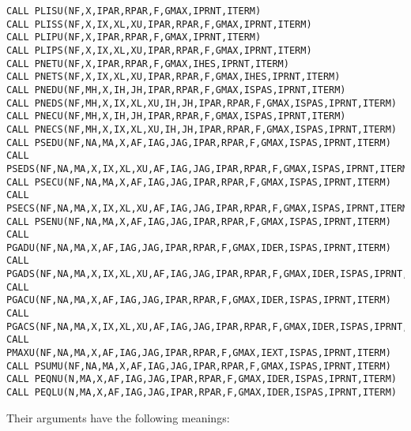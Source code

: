 \documentclass{esub2acm}
\begin{document}
\begin{verbatim}
CALL PLISU(NF,X,IPAR,RPAR,F,GMAX,IPRNT,ITERM)
CALL PLISS(NF,X,IX,XL,XU,IPAR,RPAR,F,GMAX,IPRNT,ITERM)
CALL PLIPU(NF,X,IPAR,RPAR,F,GMAX,IPRNT,ITERM)
CALL PLIPS(NF,X,IX,XL,XU,IPAR,RPAR,F,GMAX,IPRNT,ITERM)
CALL PNETU(NF,X,IPAR,RPAR,F,GMAX,IHES,IPRNT,ITERM)
CALL PNETS(NF,X,IX,XL,XU,IPAR,RPAR,F,GMAX,IHES,IPRNT,ITERM)
CALL PNEDU(NF,MH,X,IH,JH,IPAR,RPAR,F,GMAX,ISPAS,IPRNT,ITERM)
CALL PNEDS(NF,MH,X,IX,XL,XU,IH,JH,IPAR,RPAR,F,GMAX,ISPAS,IPRNT,ITERM)
CALL PNECU(NF,MH,X,IH,JH,IPAR,RPAR,F,GMAX,ISPAS,IPRNT,ITERM)
CALL PNECS(NF,MH,X,IX,XL,XU,IH,JH,IPAR,RPAR,F,GMAX,ISPAS,IPRNT,ITERM)
CALL PSEDU(NF,NA,MA,X,AF,IAG,JAG,IPAR,RPAR,F,GMAX,ISPAS,IPRNT,ITERM)
CALL PSEDS(NF,NA,MA,X,IX,XL,XU,AF,IAG,JAG,IPAR,RPAR,F,GMAX,ISPAS,IPRNT,ITERM)
CALL PSECU(NF,NA,MA,X,AF,IAG,JAG,IPAR,RPAR,F,GMAX,ISPAS,IPRNT,ITERM)
CALL PSECS(NF,NA,MA,X,IX,XL,XU,AF,IAG,JAG,IPAR,RPAR,F,GMAX,ISPAS,IPRNT,ITERM)
CALL PSENU(NF,NA,MA,X,AF,IAG,JAG,IPAR,RPAR,F,GMAX,ISPAS,IPRNT,ITERM)
CALL PGADU(NF,NA,MA,X,AF,IAG,JAG,IPAR,RPAR,F,GMAX,IDER,ISPAS,IPRNT,ITERM)
CALL PGADS(NF,NA,MA,X,IX,XL,XU,AF,IAG,JAG,IPAR,RPAR,F,GMAX,IDER,ISPAS,IPRNT,ITERM)
CALL PGACU(NF,NA,MA,X,AF,IAG,JAG,IPAR,RPAR,F,GMAX,IDER,ISPAS,IPRNT,ITERM)
CALL PGACS(NF,NA,MA,X,IX,XL,XU,AF,IAG,JAG,IPAR,RPAR,F,GMAX,IDER,ISPAS,IPRNT,ITERM)
CALL PMAXU(NF,NA,MA,X,AF,IAG,JAG,IPAR,RPAR,F,GMAX,IEXT,ISPAS,IPRNT,ITERM)
CALL PSUMU(NF,NA,MA,X,AF,IAG,JAG,IPAR,RPAR,F,GMAX,ISPAS,IPRNT,ITERM)
CALL PEQNU(N,MA,X,AF,IAG,JAG,IPAR,RPAR,F,GMAX,IDER,ISPAS,IPRNT,ITERM)
CALL PEQLU(N,MA,X,AF,IAG,JAG,IPAR,RPAR,F,GMAX,IDER,ISPAS,IPRNT,ITERM)
\end{verbatim}

Their arguments have the following meanings:

\vspace{3mm}
\small
\end{document}
